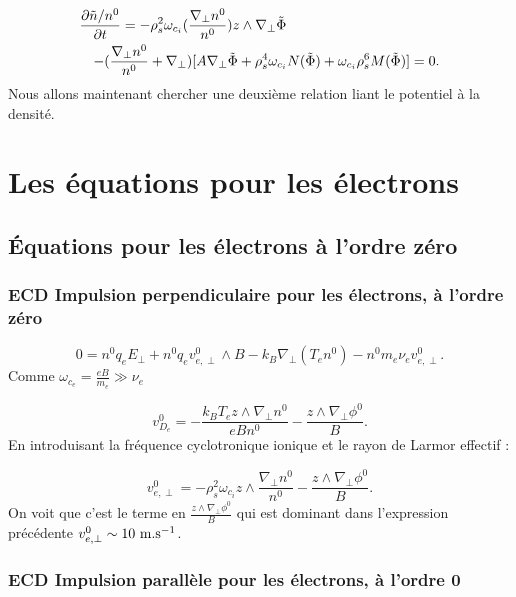 \documentclass{book}
\begin{document}
\begin{eqnarray}\label{rel1}
\lefteqn{\frac{\partial \tilde n/n^0}{\partial t}
=-\rho_s^2\omega_{c_i}(\frac{\nabla_\perp n^0}{n^0})
z\wedge\nabla_\perp\tilde\Phi} \nonumber\\
&&-(\frac{\nabla_\perp n^0}{n^0} + \nabla_\perp)
[A\nabla_\perp\tilde\Phi+\rho_s^4\omega_{c_i}N(\tilde{\Phi})+\omega_{c_i}\rho_s^6M(\tilde\Phi)]=0.
\end{eqnarray}
Nous allons maintenant chercher une deuxi\`eme relation liant le
potentiel \`a la densit\'e.


\section{Les \'equations pour les \'electrons}
\subsection{\'Equations pour les \'electrons \`a l'ordre z\'ero}
\subsubsection{ECD Impulsion perpendiculaire pour les \'electrons, \`a l'ordre z\'ero}


\begin{equation}
0=n^0q_e E_\perp+n^0q_e v_{e,\perp}^0\wedge B- k_B\nabla_\perp (T_en^0)-n^0 m_e\nu_e v_{e,\perp}^0.
\end{equation}
Comme $\omega_{c_e}=\frac{e B}{m_e}\gg \nu_e$


\begin{equation}
v_{D_e}^0=-\frac{k_B T_e z\wedge \nabla_\perp n^0}{e B
n^0}-\frac{z\wedge \nabla_\perp\phi^0}{B}.
\end{equation}
En introduisant la fr\'equence cyclotronique ionique et le rayon
de Larmor effectif :


\begin{equation}
v_{e,\perp}^0=-\rho_s^2\omega_{c_i}z\wedge\frac{\nabla_\perp n^0}{n^0}-\frac{z\wedge \nabla_\perp\phi^0}{B}.
\end{equation}
On voit que c'est le terme en $\frac{z\wedge \nabla_\perp\phi^0}{B}$
qui est dominant dans l'expression pr\'ec\'edente
$v_{e,\perp}^0\sim 10 \ {\rm m.s}^{-1}$.

\subsubsection{ECD Impulsion parall\`ele pour les \'electrons, \`a
l'ordre 0} 
\end{document}
